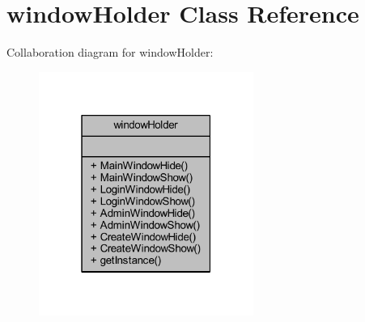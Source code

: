 \hypertarget{classwindow_holder}{}\section{window\+Holder Class Reference}
\label{classwindow_holder}


Collaboration diagram for window\+Holder\+:\nopagebreak
\begin{figure}[H]
\begin{center}
\leavevmode
\includegraphics[width=199pt]{classwindow_holder__coll__graph}
\end{center}
\end{figure}

